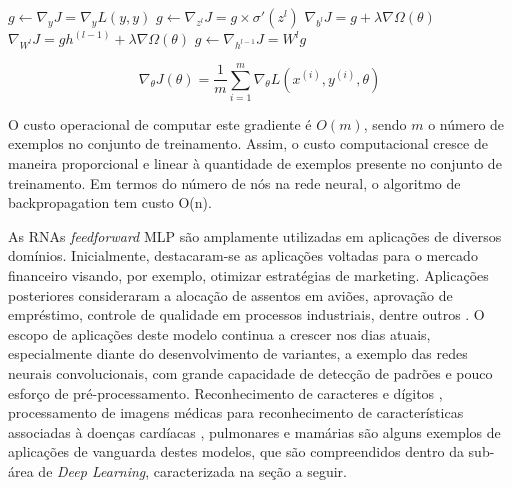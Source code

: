 \begin{algorithm}
	\begin{algorithmic}
		\State $g \gets \nabla_y J = \nabla_y L(y,y)$
			\State $g \gets \nabla_{z^l} J = g \times \sigma'(z^l) $
			\State $\nabla_{b^l} J = g + \lambda \nabla \Omega(\theta)$
			\State $\nabla_{W^l} J = g h^(l-1) + \lambda \nabla \Omega(\theta)$
			\State $g \gets \nabla_{h^{l-1}} J = W^l g$
		\EndFor
	\end{algorithmic}
\end{algorithm}

\begin{equation}\label{eq:gradiente}
	\nabla_{\theta} J(\theta) = \frac{1}{m} \sum_{i=1}^{m} \nabla_{\theta} L(x^{(i)}, y^{(i)}, \theta)
\end{equation}



O custo operacional de computar este gradiente é $O(m)$, sendo $m$ o número de exemplos no conjunto de treinamento. Assim, o custo computacional cresce de maneira proporcional e linear à quantidade de exemplos presente no conjunto de treinamento. Em termos do número de nós na rede neural, o algoritmo de backpropagation tem custo O(n).

As RNAs \emph{feedforward} MLP são amplamente utilizadas em aplicações de diversos domínios. Inicialmente, destacaram-se as aplicações voltadas para o mercado financeiro visando, por exemplo, otimizar estratégias de marketing. Aplicações posteriores consideraram a alocação de assentos em aviões, aprovação de empréstimo, controle de qualidade em processos industriais, dentre outros \cite{widrow1994neural}. O escopo de aplicações deste modelo continua a crescer nos dias atuais, especialmente diante do desenvolvimento de variantes, a exemplo das redes neurais convolucionais, com grande capacidade de detecção de padrões e pouco esforço de pré-processamento. Reconhecimento de caracteres e dígitos  \cite{lenet}, processamento de imagens médicas para reconhecimento de características associadas à doenças cardíacas \cite{oktay2018anatomically}, pulmonares \cite{mingchen2018holistic} e mamárias \cite{dubrovina2018mammography} são alguns exemplos de aplicações de vanguarda destes modelos, que são compreendidos dentro da sub-área de \emph{Deep Learning}, caracterizada na seção a seguir.
